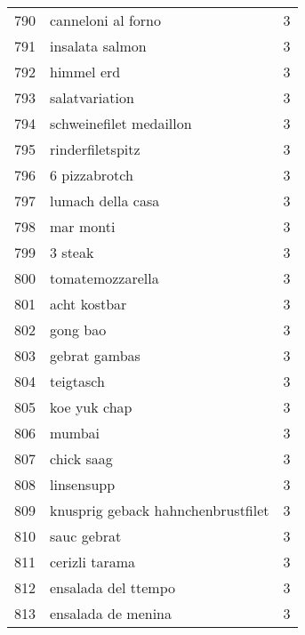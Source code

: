 \begin{tabular}{llr}
790  &                                 canneloni al forno &      3 \\
791  &                                    insalata salmon &      3 \\
792  &                                         himmel erd &      3 \\
793  &                                     salatvariation &      3 \\
794  &                            schweinefilet medaillon &      3 \\
795  &                                   rinderfiletspitz &      3 \\
796  &                                      6 pizzabrotch &      3 \\
797  &                                  lumach della casa &      3 \\
798  &                                          mar monti &      3 \\
799  &                                            3 steak &      3 \\
800  &                                   tomatemozzarella &      3 \\
801  &                                       acht kostbar &      3 \\
802  &                                           gong bao &      3 \\
803  &                                      gebrat gambas &      3 \\
804  &                                          teigtasch &      3 \\
805  &                                       koe yuk chap &      3 \\
806  &                                             mumbai &      3 \\
807  &                                         chick saag &      3 \\
808  &                                         linsensupp &      3 \\
809  &                 knusprig geback hahnchenbrustfilet &      3 \\
810  &                                        sauc gebrat &      3 \\
811  &                                     cerizli tarama &      3 \\
812  &                                ensalada del ttempo &      3 \\
813  &                                 ensalada de menina &      3 \\

\end{tabular}
